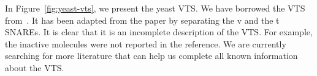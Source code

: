 

In Figure~\ref{fig:yeast-vts}, we present the yeast VTS.
%
We have borrowed the VTS from~\cite{burri2004complete}.
%
It has been adapted from the paper by
separating the v and the t SNAREs. 
%
It is clear that it is an incomplete description of the VTS.
%
For example, the inactive molecules were not reported in the reference.
%
We are currently searching for more literature that can help us complete
all known information about the VTS.
%



